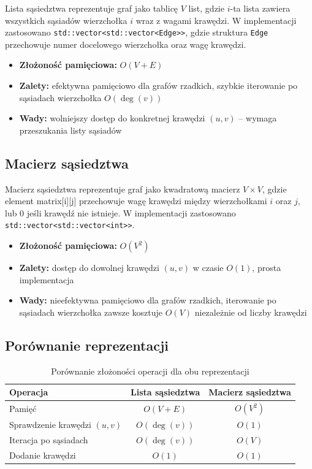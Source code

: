 \documentclass[12pt,a4paper]{article}
\begin{document}
Lista sąsiedztwa reprezentuje graf jako tablicę $V$ list, gdzie $i$-ta lista
zawiera wszystkich sąsiadów wierzchołka $i$ wraz z wagami krawędzi.
W implementacji zastosowano \texttt{std::vector<std::vector<Edge>>},
gdzie struktura \texttt{Edge} przechowuje numer docelowego wierzchołka
oraz wagę krawędzi.
 
\begin{itemize}
    \item \textbf{Złożoność pamięciowa:} $O(V + E)$
    \item \textbf{Zalety:} efektywna pamięciowo dla grafów rzadkich,
          szybkie iterowanie po sąsiadach wierzchołka $O(\deg(v))$
    \item \textbf{Wady:} wolniejszy dostęp do konkretnej krawędzi $(u, v)$
          -- wymaga przeszukania listy sąsiadów
\end{itemize}
 
\subsection{Macierz sąsiedztwa}
 
Macierz sąsiedztwa reprezentuje graf jako kwadratową macierz $V \times V$,
gdzie element matrix[i][j] przechowuje wagę krawędzi między
wierzchołkami $i$ oraz $j$, lub 0 jeśli krawędź nie istnieje.
W implementacji zastosowano \texttt{std::vector<std::vector<int>>}.
 
\begin{itemize}
    \item \textbf{Złożoność pamięciowa:} $O(V^2)$
    \item \textbf{Zalety:} dostęp do dowolnej krawędzi $(u, v)$ w czasie
          $O(1)$, prosta implementacja
    \item \textbf{Wady:} nieefektywna pamięciowo dla grafów rzadkich,
          iterowanie po sąsiadach wierzchołka zawsze kosztuje $O(V)$
          niezależnie od liczby krawędzi
\end{itemize}
 
\subsection{Porównanie reprezentacji}
 
\begin{table}[H]
    \centering
    \caption{Porównanie złożoności operacji dla obu reprezentacji}
    \begin{tabular}{lcc}
        \toprule
        \textbf{Operacja} & \textbf{Lista sąsiedztwa} & \textbf{Macierz sąsiedztwa} \\
        \midrule
        Pamięć                       & $O(V + E)$    & $O(V^2)$ \\
        Sprawdzenie krawędzi $(u,v)$ & $O(\deg(v))$  & $O(1)$   \\
        Iteracja po sąsiadach        & $O(\deg(v))$  & $O(V)$   \\
        Dodanie krawędzi             & $O(1)$        & $O(1)$   \\
        \bottomrule
    \end{tabular}
\end{table}
 
\end{document}

